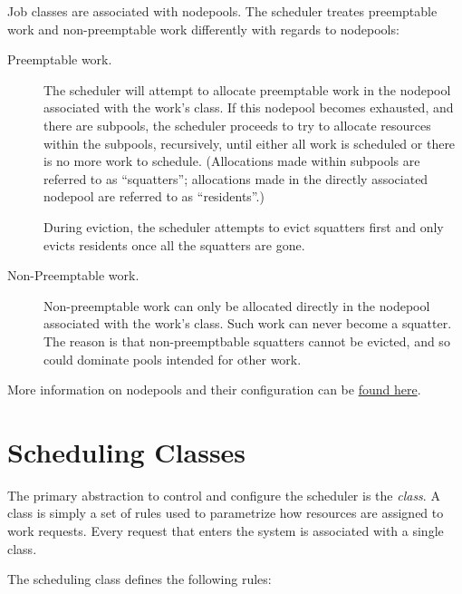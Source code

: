     Job classes are associated with nodepools.  The scheduler treates preemptable work and
    non-preemptable work differently with regards to nodepools:
    \begin{description}
      \item[Preemptable work.] The scheduler will attempt to allocate preemptable work in
        the nodepool associated with the work's class.  If this nodepool becomes exhausted,
        and there are subpools, the scheduler proceeds to try to allocate resources within
        the subpools, recursively, until either all work is scheduled or there is no more
        work to schedule.  (Allocations made within subpools are referred to as ``squatters'';
        allocations made in the directly associated nodepool are referred to as ``residents''.)

        During eviction, the scheduler attempts to evict squatters first and only evicts
        residents once all the squatters are gone.
        
      \item[Non-Preemptable work.]  Non-preemptable work can only be allocated directly
        in the nodepool associated with the work's class.  Such work can never become a
        squatter.  The reason is that non-preemptbable squatters cannot be evicted, and so
        could dominate pools intended for other work.
     \end{description}    
    
    More information on nodepools and their configuration can be \hyperref[subsec:nodepools]{found here}.

    \section{Scheduling Classes}
    \label{sec:rm.job-classes}
    The primary abstraction to control and configure the scheduler is the {\em class}. A class is simply a set 
    of rules used to parametrize how resources are assigned to work requests. Every request that enters the system is 
    associated with a single class. 
    
    The scheduling class defines the following rules: 
    

